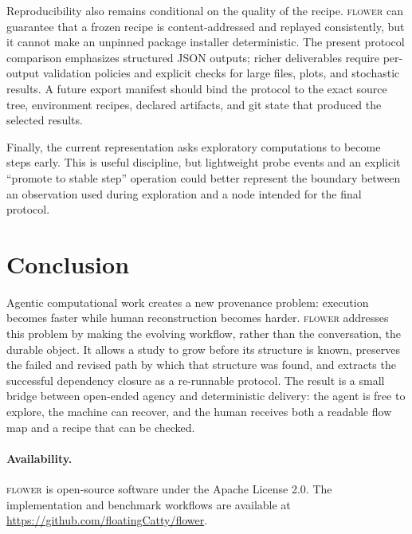 \documentclass[10pt]{article}
\newcommand{\flower}{\textsc{flower}}
\begin{document}
Reproducibility also remains conditional on the quality of the recipe. \flower{} can guarantee that a frozen
recipe is content-addressed and replayed consistently, but it cannot make an unpinned package installer
deterministic. The present protocol comparison emphasizes structured JSON outputs; richer deliverables require
per-output validation policies and explicit checks for large files, plots, and stochastic results. A future
export manifest should bind the protocol to the exact source tree, environment recipes, declared artifacts,
and git state that produced the selected results.

Finally, the current representation asks exploratory computations to become steps early. This is useful
discipline, but lightweight probe events and an explicit ``promote to stable step'' operation could better
represent the boundary between an observation used during exploration and a node intended for the final
protocol.

\section{Conclusion}

Agentic computational work creates a new provenance problem: execution becomes faster while human
reconstruction becomes harder. \flower{} addresses this problem by making the evolving workflow, rather than
the conversation, the durable object. It allows a study to grow before its structure is known, preserves the
failed and revised path by which that structure was found, and extracts the successful dependency closure as a
re-runnable protocol. The result is a small bridge between open-ended agency and deterministic delivery: the
agent is free to explore, the machine can recover, and the human receives both a readable flow map and a
recipe that can be checked.

\paragraph{Availability.}
\flower{} is open-source software under the Apache License 2.0. The implementation and benchmark workflows are
available at \url{https://github.com/floatingCatty/flower}.
\end{document}
